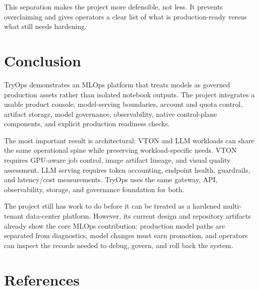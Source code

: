 \documentclass[12pt,a4paper,oneside]{report}
\begin{document}
This separation makes the project more defensible, not less. It prevents overclaiming and gives operators a clear list of what is production-ready versus what still needs hardening.

\chapter{Conclusion}

TryOps demonstrates an MLOps platform that treats models as governed production assets rather than isolated notebook outputs. The project integrates a usable product console, model-serving boundaries, account and quota control, artifact storage, model governance, observability, native control-plane components, and explicit production readiness checks.

The most important result is architectural: VTON and LLM workloads can share the same operational spine while preserving workload-specific needs. VTON requires GPU-aware job control, image artifact lineage, and visual quality assessment. LLM serving requires token accounting, endpoint health, guardrails, and latency/cost measurements. TryOps uses the same gateway, API, observability, storage, and governance foundation for both.

The project still has work to do before it can be treated as a hardened multi-tenant data-center platform. However, its current design and repository artifacts already show the core MLOps contribution: production model paths are separated from diagnostics, model changes must earn promotion, and operators can inspect the records needed to debug, govern, and roll back the system.

\chapter*{References}
\end{document}
